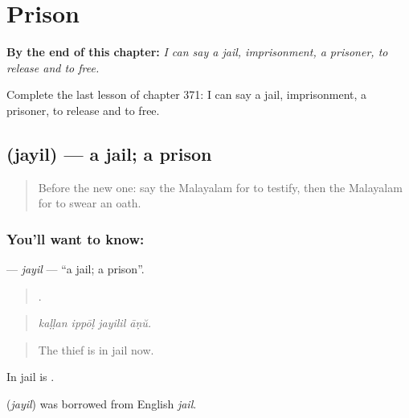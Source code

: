 
\chapter{Prison}
\label{ch:ml-prison}

\begin{chapteropening}
\textbf{By the end of this chapter:} \emph{I can say a jail, imprisonment, a prisoner, to release and to free.}

Complete the last lesson of chapter 371: I can say a jail, imprisonment, a prisoner, to release and to free.
\end{chapteropening}

\section[\texorpdfstring{\ml{ജയിൽ} (jayil)}{ജയിൽ (jayil)}]{ (jayil) — a jail; a prison}

\label{lesson:ML-C371-jayil}



\begin{quote}
Before the new one: say the Malayalam for to testify, then the Malayalam for to swear an oath.
\end{quote}

\subsection*{You'll want to know: }
\textbf{} — \emph{jayil} — \textquotedblleft{}a jail; a prison\textquotedblright{}.

\begin{quote}
   .
\end{quote}

\begin{quote}
\emph{kaḷḷan ippōḷ jayilil āṇŭ.}
\end{quote}

\begin{quote}
The thief is in jail now.
\end{quote}

In jail is .

\begin{cousinweb}
\textbf{} (\emph{jayil}) was borrowed from English \emph{jail}.
\end{cousinweb}

